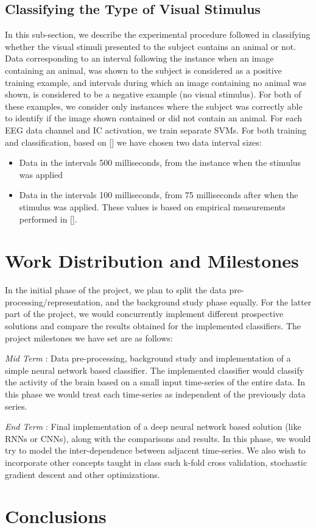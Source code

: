 \documentclass{article} %
\begin{document}
\subsection{Classifying the Type of Visual Stimulus}
In this sub-section, we describe the experimental procedure followed in classifying whether the visual stimuli presented to the subject contains an animal or not. Data corresponding to an interval following the instance when an image containing an animal, was shown to the subject is considered as a positive training example, and intervals during which an image containing no animal was shown, is considered to be a negative example (no visual stimulus). For both of these examples, we consider only instances where the subject was correctly able to identify if the image shown contained or did not contain an animal. For each EEG data channel and IC activation, we train separate SVMs. For both training and classification, based on [] we have chosen two data interval sizes:

\begin{itemize}
	\item Data in the intervals 500 milliseconds, from the instance when the stimulus was applied
	\item Data in the intervals 100 milliseconds, from 75 milliseconds after when the stimulus was applied. These values is based on empirical measurements performed in [].
\end{itemize}







\section{Work Distribution and Milestones}

In the initial phase of the project, we plan to split the data pre-processing/representation, and the background study phase equally. For the latter part of the project, we would concurrently implement different prospective solutions and compare the results obtained for the implemented classifiers.
The project milestones we have set are as follows:

\textit{Mid Term} : Data pre-processing, background study and implementation of a simple neural network based classifier. The implemented classifier would classify the activity of the brain based on a small input time-series of the entire data. In this phase we would treat each time-series as independent of the previously data series.

\textit{End Term} : Final implementation of a deep neural network based solution (like RNNs or CNNs), along with the comparisons and results. In this phase, we would try to model the inter-dependence between adjacent time-series. We also wish to incorporate other concepts taught in class such k-fold cross validation, stochastic gradient descent and other optimizations.

\section{Conclusions}



\end{document}
